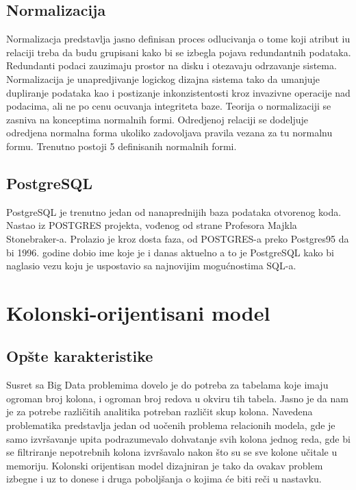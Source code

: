 \documentclass[12pt,oneside]{memoir}
\begin{document}
\subsection{Normalizacija}
Normalizacja predstavlja jasno definisan proces odlucivanja o tome koji atribut iu relaciji treba da budu grupisani kako bi se izbegla pojava redundantnih podataka. Redundanti podaci zauzimaju prostor na disku i otezavaju odrzavanje sistema. Normalizacija je unapredjivanje  logickog dizajna sistema tako da umanjuje dupliranje podataka kao i postizanje inkonzistentosti kroz invazivne operacije nad podacima, ali ne po cenu ocuvanja integriteta baze. Teorija o normalizaciji se zasniva na konceptima normalnih formi. Odredjenoj relaciji se dodeljuje odredjena normalna forma ukoliko zadovoljava pravila vezana za tu normalnu formu. Trenutno postoji 5 definisanih normalnih formi.


\subsection{PostgreSQL}

PostgreSQL je trenutno jedan od nanaprednijih baza podataka otvorenog koda.  Nastao iz POSTGRES projekta, vođenog od strane
Profesora Majkla Stonebraker-a. Prolazio je kroz dosta faza, od POSTGRES-a preko Postgres95 da bi 1996. godine dobio ime koje je i danas aktuelno a to je PostgreSQL kako bi naglasio vezu koju je uspostavio sa najnovijim mogućnostima SQL-a. \cite{PostgresHistory}
\section{Kolonski-orijentisani model}
\subsection{Opšte karakteristike}
\cite{ColumnarOriented}
Susret sa Big Data problemima dovelo je do potreba za tabelama koje imaju ogroman broj kolona, i ogroman broj redova u okviru tih tabela. Jasno je da nam je za potrebe različitih analitika potreban različit skup kolona. Navedena problematika predstavlja jedan od uočenih problema relacionih modela, gde je samo izvršavanje upita podrazumevalo dohvatanje svih kolona jednog reda, gde bi se filtriranje nepotrebnih kolona izvršavalo nakon što su se sve kolone učitale u memoriju. Kolonski orijentisan model dizajniran je tako da ovakav problem izbegne i uz to donese i druga poboljšanja o kojima će biti reči u nastavku.
\end{document}
